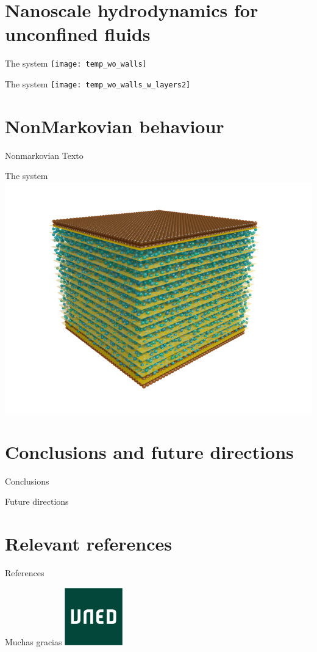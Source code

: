 \documentclass{beamer}
\begin{document}
\section{Nanoscale hydrodynamics for unconfined fluids}
\begin{frame}{The system}
  \texttt{[image: temp\_wo\_walls]}
\end{frame}
\begin{frame}{The system}
  \texttt{[image: temp\_wo\_walls\_w\_layers2]}
\end{frame}

\section{NonMarkovian behaviour}
\begin{frame}{Nonmarkovian}
Texto
\end{frame}
\begin{frame}{The system}
  \includegraphics[width=.5\linewidth]{PRL3_gold2_wo_diffuse}
\end{frame}

\section{Conclusions and future directions}
\begin{frame}{Conclusions}
\end{frame}
\begin{frame}{Future directions}
\end{frame}

\section{Relevant references}
\begin{frame}{References}
\end{frame}
\begin{frame}{}
  \centering
  Muchas gracias
  \includegraphics[width=2.5cm]{logo}
\end{frame}
\end{document}
